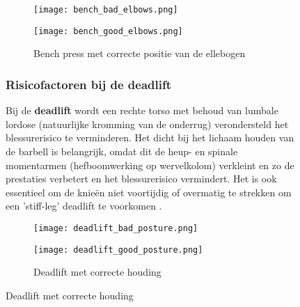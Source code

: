 \begin{figure}[h]\begin{figure}[h]
  \centering
  \begin{minipage}{0.45\textwidth}
      \centering
      \texttt{[image: bench\_bad\_elbows.png]}
      \caption[Figuur 1]{\label{fig:bench_incorrect}Bench press met incorrecte positie van de ellebogen \autocite{Ronai2018}}
  \end{minipage}
  \hfill %
  \begin{minipage}{0.45\textwidth}
      \centering
      \texttt{[image: bench\_good\_elbows.png]}
      \caption[Figuur 2]{\label{fig:bench_correct}Bench press met correcte positie van de ellebogen \autocite{Ronai2018}}
  \end{minipage}
\end{figure}    

\subsubsection{Risicofactoren bij de deadlift}
\label{subsubsec:risicofactoren-deadlift}
Bij de \textbf{deadlift} wordt een rechte torso met behoud van lumbale lordose (natuurlijke kromming van de onderrug) verondersteld het blessurerisico te verminderen. 
Het dicht bij het lichaam houden van de barbell is belangrijk, omdat dit de heup- en spinale momentarmen (hefboomwerking op wervelkolom) verkleint en zo de prestaties verbetert en het blessurerisico vermindert. 
Het is ook essentieel om de knieën niet voortijdig of overmatig te strekken om een 'stiff-leg' deadlift te voorkomen \autocite{BengtssonEtAl2018}.

\begin{figure}[h]
  \centering
  \begin{minipage}{0.45\textwidth}
      \centering
      \texttt{[image: deadlift\_bad\_posture.png]}
      \caption[Figuur 1]{\label{fig:deadlift_incorrect}Deadlift met incorrecte houding \autocite{BirdEtAl2010}}
  \end{minipage}
  \hfill %
  \begin{minipage}{0.45\textwidth}
      \centering
      \texttt{[image: deadlift\_good\_posture.png]}
      \caption[Figuur 2]{\label{fig:deadlift_correct}Deadlift met correcte houding \autocite{BirdEtAl2010}}
  \end{minipage}
\end{figure}   


\end{figure}
